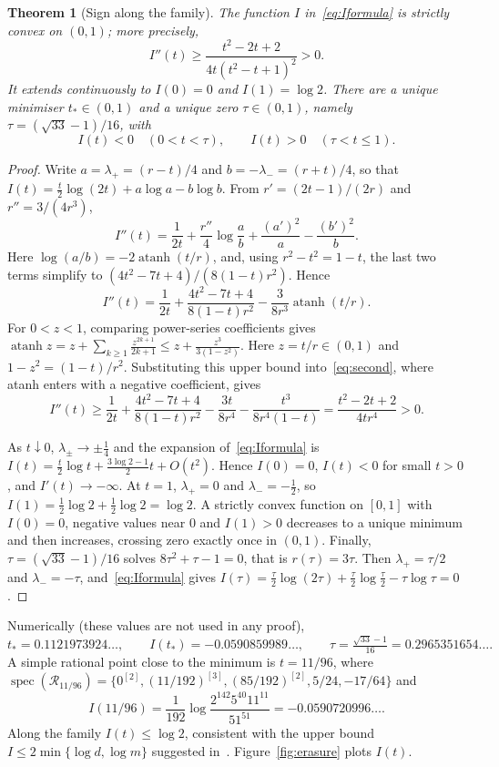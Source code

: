 \documentclass[11pt,a4paper]{article}
\newtheorem{theorem}{Theorem}[section]
\theoremstyle{definition}\newtheorem{definition}[theorem]{Definition}
\theoremstyle{remark}\newtheorem{remark}[theorem]{Remark}
\newcommand{\R}{\mathcal R}
\begin{document}
\begin{theorem}[Sign along the family]\label{thm:convex}
The function $I$ in~\eqref{eq:Iformula} is strictly convex on $(0,1)$; more precisely,
\begin{equation}\label{eq:convexlower}
 I''(t)\ge\frac{t^2-2t+2}{4t(t^2-t+1)^2}>0.
\end{equation}
It extends continuously to $I(0)=0$ and $I(1)=\log2$. There are a unique minimiser $t_*\in(0,1)$ and a unique zero $\tau\in(0,1)$, namely $\tau=(\sqrt{33}-1)/16$, with
\[
 I(t)<0\quad(0<t<\tau),\qquad I(t)>0\quad(\tau<t\le1).
\]
\end{theorem}
\begin{proof}
Write $a=\lambda_+=(r-t)/4$ and $b=-\lambda_-=(r+t)/4$, so that $I(t)=\tfrac t2\log(2t)+a\log a-b\log b$. From $r'=(2t-1)/(2r)$ and $r''=3/(4r^3)$,
\[
 I''(t)=\frac1{2t}+\frac{r''}{4}\log\frac ab+\frac{(a')^2}{a}-\frac{(b')^2}{b}.
\]
Here $\log(a/b)=-2\operatorname{atanh}(t/r)$, and, using $r^2-t^2=1-t$, the last two terms simplify to $(4t^2-7t+4)/(8(1-t)r^2)$. Hence
\begin{equation}\label{eq:second}
 I''(t)=\frac1{2t}+\frac{4t^2-7t+4}{8(1-t)r^2}
       -\frac3{8r^3}\operatorname{atanh}(t/r).
\end{equation}
For $0<z<1$, comparing power-series coefficients gives
$\operatorname{atanh}z=z+\sum_{k\ge1}\frac{z^{2k+1}}{2k+1}\le z+\frac{z^3}{3(1-z^2)}$.
Here $z=t/r\in(0,1)$ and $1-z^2=(1-t)/r^2$. Substituting this upper bound into~\eqref{eq:second}, where atanh enters with a negative coefficient, gives
\[
 I''(t)\ge\frac1{2t}+\frac{4t^2-7t+4}{8(1-t)r^2}
       -\frac{3t}{8r^4}-\frac{t^3}{8r^4(1-t)}
 =\frac{t^2-2t+2}{4tr^4}>0.
\]

As $t\downarrow0$, $\lambda_\pm\to\pm\tfrac14$ and the expansion of~\eqref{eq:Iformula} is
$I(t)=\tfrac t2\log t+\tfrac{3\log2-1}{2}t+O(t^2)$.
Hence $I(0)=0$, $I(t)<0$ for small $t>0$, and $I'(t)\to-\infty$. At $t=1$, $\lambda_+=0$ and $\lambda_-=-\tfrac12$, so $I(1)=\tfrac12\log2+\tfrac12\log2=\log2$. A strictly convex function on $[0,1]$ with $I(0)=0$, negative values near $0$ and $I(1)>0$ decreases to a unique minimum and then increases, crossing zero exactly once in $(0,1)$. Finally, $\tau=(\sqrt{33}-1)/16$ solves $8\tau^2+\tau-1=0$, that is $r(\tau)=3\tau$. Then $\lambda_+=\tau/2$ and $\lambda_-=-\tau$, and~\eqref{eq:Iformula} gives $I(\tau)=\tfrac\tau2\log(2\tau)+\tfrac\tau2\log\tfrac\tau2-\tau\log\tau=0$.
\end{proof}

Numerically (these values are not used in any proof),
\[
 t_*=0.1121973924\ldots,\qquad I(t_*)=-0.0590859989\ldots,\qquad
 \tau=\tfrac{\sqrt{33}-1}{16}=0.2965351654\ldots.
\]
A simple rational point close to the minimum is $t=11/96$, where
$\operatorname{spec}(\R_{11/96})=\{0^{[2]},(11/192)^{[3]},(85/192)^{[2]},5/24,-17/64\}$ and
\[
 I(11/96)=\frac1{192}\log\frac{2^{142}5^{40}11^{11}}{51^{51}}=-0.0590720996\ldots.
\]
Along the family $I(t)\le\log2$, consistent with the upper bound $I\le2\min\{\log d,\log m\}$ suggested in~\cite[Section~5]{FP}. Figure~\ref{fig:erasure} plots $I(t)$.
\end{document}
